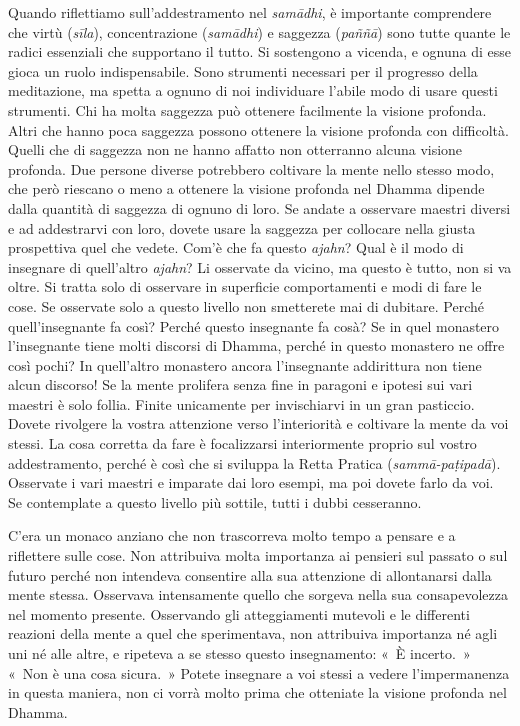 Quando riflettiamo sull'addestramento nel \emph{samādhi}, è importante
comprendere che virtù (\emph{sīla}), concentrazione (\emph{samādhi}) e
saggezza (\emph{paññā}) sono tutte quante le radici essenziali che
supportano il tutto. Si sostengono a vicenda, e ognuna di esse gioca un
ruolo indispensabile. Sono strumenti necessari per il progresso della
meditazione, ma spetta a ognuno di noi individuare l'abile modo di usare
questi strumenti. Chi ha molta saggezza può ottenere facilmente la
visione profonda. Altri che hanno poca saggezza possono ottenere la
visione profonda con difficoltà. Quelli che di saggezza non ne hanno
affatto non otterranno alcuna visione profonda. Due persone diverse
potrebbero coltivare la mente nello stesso modo, che però riescano o
meno a ottenere la visione profonda nel Dhamma dipende dalla quantità di
saggezza di ognuno di loro. Se andate a osservare maestri diversi e ad
addestrarvi con loro, dovete usare la saggezza per collocare nella
giusta prospettiva quel che vedete. Com'è che fa questo \emph{ajahn}?
Qual è il modo di insegnare di quell'altro \emph{ajahn}? Li osservate da
vicino, ma questo è tutto, non si va oltre. Si tratta solo di osservare
in superficie comportamenti e modi di fare le cose. Se osservate solo a
questo livello non smetterete mai di dubitare. Perché quell'insegnante
fa così? Perché questo insegnante fa cosà? Se in quel monastero
l'insegnante tiene molti discorsi di Dhamma, perché in questo monastero
ne offre così pochi? In quell'altro monastero ancora l'insegnante
addirittura non tiene alcun discorso! Se la mente prolifera senza fine
in paragoni e ipotesi sui vari maestri è solo follia. Finite unicamente
per invischiarvi in un gran pasticcio. Dovete rivolgere la vostra
attenzione verso l'interiorità e coltivare la mente da voi stessi. La
cosa corretta da fare è focalizzarsi interiormente proprio sul vostro
addestramento, perché è così che si sviluppa la Retta Pratica
(\emph{sammā-paṭipadā}). Osservate i vari maestri e imparate dai loro
esempi, ma poi dovete farlo da voi. Se contemplate a questo livello più
sottile, tutti i dubbi cesseranno.

C'era un monaco anziano che non trascorreva molto tempo a pensare e a
riflettere sulle cose. Non attribuiva molta importanza ai pensieri sul
passato o sul futuro perché non intendeva consentire alla sua attenzione
di allontanarsi dalla mente stessa. Osservava intensamente quello che
sorgeva nella sua consapevolezza nel momento presente. Osservando gli
atteggiamenti mutevoli e le differenti reazioni della mente a quel che
sperimentava, non attribuiva importanza né agli uni né alle altre, e
ripeteva a se stesso questo insegnamento: «~È incerto.~» «~Non è una
cosa sicura.~» Potete insegnare a voi stessi a vedere l'impermanenza in
questa maniera, non ci vorrà molto prima che otteniate la visione
profonda nel Dhamma.

